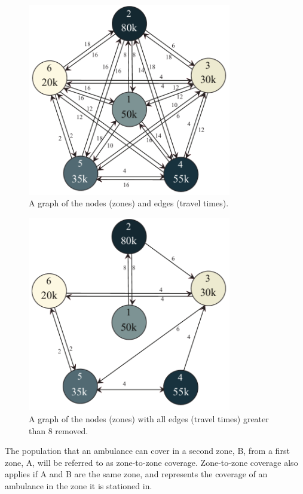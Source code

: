 \documentclass[notitlepage, 12pt]{article}
\begin{document}
\newpage

\begin{figure}[htbp]
\begin{center}
\includegraphics[width=3.5in]{6point.pdf}
\caption{A graph of the nodes (zones) and edges (travel times).}
\label{satan1}
\end{center}
\end{figure}

\begin{figure}[htbp]
\begin{center}
\includegraphics[width=3.5in]{greedy6point.pdf}
\caption{A graph of the nodes (zones) with all edges (travel times) greater than 8 removed.}
\label{satan2}
\end{center}
\end{figure}

The population that an ambulance can cover in a second zone, B, from a first zone, A, will be referred to as zone-to-zone coverage. Zone-to-zone coverage also applies if A and B are the same zone, and represents the coverage of an ambulance in the zone it is stationed in.
\end{document}
